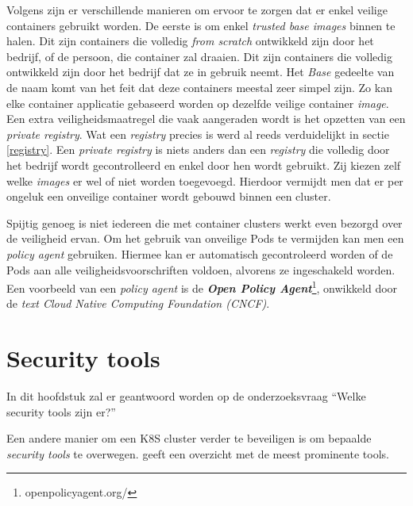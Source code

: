 Volgens \textcite{Lewis2019} zijn er verschillende manieren om ervoor te zorgen dat er enkel veilige containers gebruikt worden. De eerste is om enkel \textit{trusted base images} binnen te halen. Dit zijn containers die volledig \textit{from scratch} ontwikkeld zijn door het bedrijf, of de persoon, die container zal draaien. Dit zijn containers die volledig ontwikkeld zijn door het bedrijf dat ze in gebruik neemt. Het \textit{Base} gedeelte van de naam komt van het feit dat deze containers meestal zeer simpel zijn. Zo kan elke container applicatie gebaseerd worden op dezelfde veilige container \textit{image}.
Een extra veiligheidsmaatregel die vaak aangeraden wordt is het opzetten van een \textit{private registry}. Wat een \textit{registry} precies is werd al reeds verduidelijkt in sectie \ref{registry}. Een \textit{private registry} is niets anders dan een \textit{registry} die volledig door het bedrijf wordt gecontrolleerd en enkel door hen wordt gebruikt. Zij kiezen zelf welke \textit{images} er wel of niet worden toegevoegd. Hierdoor vermijdt men dat er per ongeluk een onveilige container wordt gebouwd binnen een cluster.

Spijtig genoeg is niet iedereen die met container clusters werkt even bezorgd over de veiligheid ervan. Om het gebruik van onveilige Pods te vermijden kan men een \textit{policy agent} gebruiken. Hiermee kan er automatisch gecontroleerd worden of de Pods aan alle veiligheidsvoorschriften voldoen, alvorens ze ingeschakeld worden. Een voorbeeld van een \textit{policy agent} is de \textbf{\textit{Open Policy Agent}}\footnote{openpolicyagent.org/}, onwikkeld door de \textit{text Cloud Native Computing Foundation (CNCF)}.

%
%

\section{Security tools} \label{tools}

 In dit hoofdstuk zal er geantwoord worden op de onderzoeksvraag ``Welke security tools zijn er?''

Een andere manier om een K8S cluster verder te beveiligen is om bepaalde \textit{security tools} te overwegen.
\textcite{Taylor2019} geeft een overzicht met de meest prominente tools.

